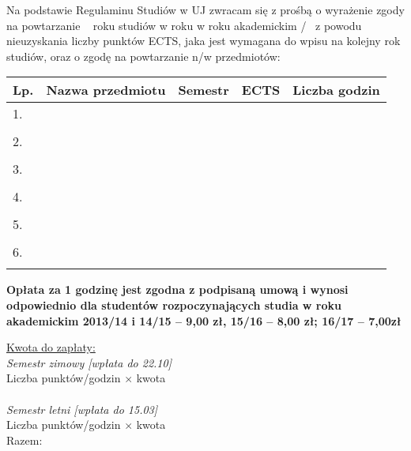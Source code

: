 \documentclass{wmiisubmission}
\begin{document}
\cracowdate
{}
\studentaddress
\addressee[-3em]{\piotrniemiec}

\vskip 0.5cm

Na podstawie Regulaminu Studiów w UJ zwracam się z prośbą o wyrażenie zgody na
powtarzanie \fillField{3cm}~ roku studiów w roku
w roku akademickim \fillField{1cm}/\fillField{1cm}~ z powodu nieuzyskania liczby
punktów ECTS, jaka jest wymagana do wpisu na kolejny
rok studiów, oraz o zgodę na powtarzanie n/w przedmiotów:\\

\begin{tabularx}{\textwidth}{|l|X|l|l|l|}

    \hline
    \textbf{Lp.} & \textbf{Nazwa przedmiotu} \hspace{0.9cm} & {\textbf{Semestr}} & \textbf{ECTS} & {\textbf{Liczba godzin}} \\
    \hline
    1.  &   &   &  &\\
        &   &   &  &\\
    \hline
    2.  &   &   &  &\\
        &   &   &  &\\
    \hline
    3.  &   &   &  &\\
        &   &   &  &\\
    \hline
    4.  &   &   &  &\\
        &   &   &  &\\
    \hline
    5.  &   &   &  &\\
        &   &   &  &\\
    \hline
    6.  &   &   &  &\\
    &   &   &  &\\
    \hline
\end{tabularx}

\vskip 0.3cm

\begin{minipage}{\textwidth}
    \footnotesize
    \bf
    Opłata za 1 godzinę jest zgodna z podpisaną umową i wynosi odpowiednio dla studentów rozpoczynających studia w roku akademickim 2013/14 i 14/15 – 9,00 zł, 15/16 – 8,00 zł; 16/17 – 7,00zł
\end{minipage}

\vfill

\noindent
\underline{Kwota do zapłaty:}\\
\textit{Semestr zimowy [wpłata do 22.10]}\\
Liczba punktów/godzin \dotfill $\times$ kwota \dotfill \\\\
\textit{Semestr letni [wpłata do 15.03]}\\
Liczba punktów/godzin \dotfill $\times$ kwota \dotfill \\

\hspace{\fill} Razem: \fillField{6cm} \hspace{2.0cm}

\vskip 1.6cm
\studentsignature
\vfill

\end{document}
